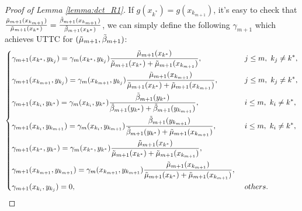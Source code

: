 \documentclass[nohyperref]{article}
\theoremstyle{plain}
\begin{document}
\begin{proof}[Proof of Lemma \ref{lemma:dct_R1}]
If $g(x_{k^*}) = g(x_{k_{m+1}})$, it's easy to check that 
$\frac{\Tilde{\mu}_{m+1} (x_{k_{m+1}})}{\Tilde{\mu}_{m+1} (x_{k^*})} = \frac{\Tilde{\beta}_{m+1} (x_{k_{m+1}})}{\Tilde{\beta}_{m+1} (x_{k^*})}$, 
we can simply define the following $\gamma_{m+1}$ which achieves UTTC for $(\Tilde{\mu}_{m+1}, \Tilde{\beta}_{m+1})$:
\begin{equation*}
    \left\{
    \begin{aligned}
        &\gamma_{m+1} (x_{k^*}, y_{k_j}) = \gamma_{m} (x_{k^*}, y_{k_j}) \frac{\Tilde{\mu}_{m+1} (x_{k^*})}{\Tilde{\mu}_{m+1} (x_{k^*}) + \Tilde{\mu}_{m+1} (x_{k_{m+1}})},& &\ j \leq m,\ k_j \neq k^*, \\
        &\gamma_{m+1} (x_{k_{m+1}}, y_{k_j}) = \gamma_{m} (x_{k_{m+1}}, y_{k_j}) \frac{\Tilde{\mu}_{m+1} (x_{k_{m+1}})}{\Tilde{\mu}_{m+1} (x_{k^*}) + \Tilde{\mu}_{m+1} (x_{k_{m+1}})},& &\ j \leq m,\ k_j \neq k^*, \\
        &\gamma_{m+1} (x_{k_i}, y_{k^*}) = \gamma_{m} (x_{k_i}, y_{k^*}) \frac{\Tilde{\beta}_{m+1} (y_{k^*})}{\Tilde{\beta}_{m+1} (y_{k^*}) + \Tilde{\beta}_{m+1} (y_{k_{m+1}})},& &\ i \leq m,\ k_i \neq k^*, \\
        &\gamma_{m+1} (x_{k_{i}}, y_{k_{m+1}}) = \gamma_{m} (x_{k_{i}}, y_{k_{m+1}}) \frac{\Tilde{\beta}_{m+1} (y_{k_{m+1}})}{\Tilde{\beta}_{m+1} (y_{k^*}) + \Tilde{\mu}_{m+1} (x_{k_{m+1}})},& &\ i \leq m,\ k_i \neq k^*, \\
        &\gamma_{m+1} (x_{k^*}, y_{k^*}) = \gamma_{m} (x_{k^*}, y_{k^*}) \frac{\Tilde{\mu}_{m+1} (x_{k^*})}{\Tilde{\mu}_{m+1} (x_{k^*}) + \Tilde{\mu}_{m+1} (x_{k_{m+1}})},& & \\
        &\gamma_{m+1} (x_{k_{m+1}}, y_{k_{m+1}}) = \gamma_{m} (x_{k_{m+1}}, y_{k_{m+1}}) \frac{\Tilde{\mu}_{m+1} (x_{k_{m+1}})}{\Tilde{\mu}_{m+1} (x_{k^*}) + \Tilde{\mu}_{m+1} (x_{k_{m+1}})}, \\
        &\gamma_{m+1} (x_{k_i}, y_{k_j}) = 0,& &\ others.
    \end{aligned}
    \right.
\end{equation*}


\end{proof}
\end{document}
